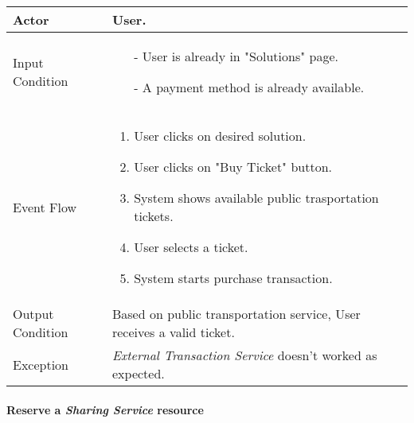 		\begin{tabular}{| l | p{} | }
			\hline
			\hline
			Actor	&		User. \\
			\hline
			Input Condition		&		\begin{itemize}
													\item[-] User is already in "Solutions" page.
													\item[-] A payment method is already available.
												\end{itemize} \\
			\hline
			Event Flow		&		\begin{enumerate}
												\item User clicks on desired solution.
												\item User clicks on "Buy Ticket" button.
												\item System shows available public trasportation tickets.
												\item User selects a ticket.
												\item	 System starts purchase transaction.
											\end{enumerate} \\
			\hline
			Output Condition		&		Based on public transportation service, User receives a valid ticket. \\
			\hline		
			Exception		&		\textit{External Transaction Service} doesn't worked as expected. \\
			\hline
			\hline
		\end{tabular}


	\paragraph{Reserve a \textit{Sharing Service} resource} \label{sharing_useCase}
	
